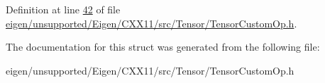 Definition at line \hyperlink{eigen_2unsupported_2_eigen_2_c_x_x11_2src_2_tensor_2_tensor_custom_op_8h_source_l00042}{42} of file \hyperlink{eigen_2unsupported_2_eigen_2_c_x_x11_2src_2_tensor_2_tensor_custom_op_8h_source}{eigen/unsupported/\+Eigen/\+C\+X\+X11/src/\+Tensor/\+Tensor\+Custom\+Op.\+h}.



The documentation for this struct was generated from the following file\+:\begin{DoxyCompactItemize}
\item 
eigen/unsupported/\+Eigen/\+C\+X\+X11/src/\+Tensor/\+Tensor\+Custom\+Op.\+h\end{DoxyCompactItemize}
